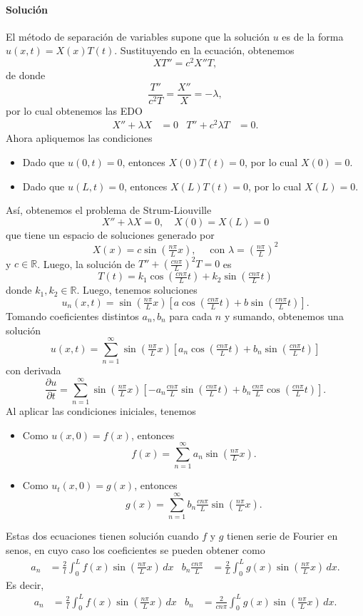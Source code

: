 \documentclass[11pt,letterpaper,draft]{report}
\newcommand\R{\mathbb R}
\newcommand\<{\langle}
\renewcommand\>{\rangle}
\begin{document}
\paragraph{Solución}
El método de separación de variables supone que la solución $u$ es de
la forma $u(x,t)=X(x)T(t)$. Sustituyendo en la ecuación, obtenemos
\[
  XT''=c^2X''T
,\]
de donde
\[
  \frac{T''}{c^2T} = \frac{X''}{X} = -\lambda
,\]
por lo cual obtenemos las EDO
\begin{align*}
  X''+\lambda X &= 0
  &
  T''+c^2\lambda T &= 0.
\end{align*}
Ahora apliquemos las condiciones
\begin{itemize}
  \item Dado que $u(0,t)=0$, entonces $X(0)T(t)=0$, por lo cual
    $X(0)=0$.
  \item Dado que $u(L,t)=0$, entonces $X(L)T(t)=0$, por lo cual
    $X(L)=0$.
\end{itemize}
Así, obtenemos el problema de Strum-Liouville
\[
  X''+\lambda X = 0, \quad X(0)=X(L)=0
\]
que tiene un espacio de soluciones generado por
\[
  X(x)=c\sin(\tfrac{n\pi}{L}x), \quad \text{ con }
  \lambda=(\tfrac{n\pi}{L})^2
\]
y $c\in\R$.
Luego, la solución de $T''+(\tfrac{cn\pi}{L})^2T=0$ es 
\[
  T(t)=k_1\cos(\tfrac{cn\pi}{L}t)+k_2\sin(\tfrac{cn\pi}{L}t)
\]
donde $k_1,k_2\in\R$.
Luego, tenemos soluciones
\[
  u_n(x,t)=\sin(\tfrac{n\pi}{L}x) \left[
    a\cos(\tfrac{cn\pi}{L}t)+b\sin(\tfrac{cn\pi}{L}t)
  \right]
.\]
Tomando coeficientes distintos $a_n,b_n$ para cada $n$ y sumando,
obtenemos una solución
\[
  u(x,t)
  =
  \sum_{n=1}^{\infty}\sin(\tfrac{n\pi}{L}x) \left[
    a_n\cos(\tfrac{cn\pi}{L}t)
    +b_n\sin(\tfrac{cn\pi}{L}t)
  \right]
\]
con derivada
\[
  \frac{\partial u}{\partial t}
  =
  \sum_{n=1}^{\infty}\sin(\tfrac{n\pi}{L}x) \left[
    -a_n \tfrac{cn\pi}{L}\sin(\tfrac{cn\pi}{L}t)
    +b_n \tfrac{cn\pi}{L}\cos(\tfrac{cn\pi}{L}t)
  \right]
.\]
Al aplicar las condiciones iniciales, tenemos
\begin{itemize}
  \item Como $u(x,0)=f(x)$, entonces
    \[
      f(x)=\sum_{n=1}^{\infty}a_n\sin(\tfrac{n\pi}{L}x)
    .\]
  \item Como $u_t(x,0)=g(x)$, entonces
    \[
      g(x) = \sum_{n=1}^{\infty}b_n
      \tfrac{cn\pi}{L}\sin(\tfrac{n\pi}{L}x)
    .\]
\end{itemize}
Estas dos ecuaciones tienen solución cuando $f$ y $g$ tienen serie de
Fourier en senos, en cuyo caso los
coeficientes se pueden obtener como
\begin{align*}
  a_n &= \frac{2}{l}\int_{0}^{L}f(x)\sin(\tfrac{n\pi}{L}x)\,dx
      &
  b_n \tfrac{cn\pi}{L} &=
  \frac{2}{L}\int_{0}^{L}g(x)\sin(\tfrac{n\pi}{L}x)\,dx.
\end{align*}
Es decir,
\begin{align*}
  a_n &= \frac{2}{l}\int_{0}^{L}f(x)\sin(\tfrac{n\pi}{L}x)\,dx
      &
  b_n &=
  \frac{2}{cn\pi}\int_{0}^{L}g(x)\sin(\tfrac{n\pi}{L}x)\,dx.
\end{align*}
\end{document}
